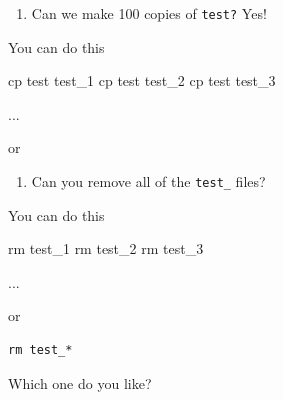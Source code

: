 \documentclass[
  letterpaper,
  DIV=11,
  numbers=noendperiod]{scrreprt}
\newenvironment{Shaded}{\begin{snugshade}}{\end{snugshade}}
\newcommand{\ControlFlowTok}[1]{\textcolor[rgb]{0.00,0.23,0.31}{#1}}
\newcommand{\DataTypeTok}[1]{\textcolor[rgb]{0.68,0.00,0.00}{#1}}
\newcommand{\DecValTok}[1]{\textcolor[rgb]{0.68,0.00,0.00}{#1}}
\newcommand{\ExtensionTok}[1]{\textcolor[rgb]{0.00,0.23,0.31}{#1}}
\newcommand{\FunctionTok}[1]{\textcolor[rgb]{0.28,0.35,0.67}{#1}}
\newcommand{\KeywordTok}[1]{\textcolor[rgb]{0.00,0.23,0.31}{#1}}
\newcommand{\NormalTok}[1]{\textcolor[rgb]{0.00,0.23,0.31}{#1}}
\newcommand{\StringTok}[1]{\textcolor[rgb]{0.13,0.47,0.30}{#1}}
\newcommand{\VariableTok}[1]{\textcolor[rgb]{0.07,0.07,0.07}{#1}}
\providecommand{\tightlist}{%
  \setlength{\itemsep}{0pt}\setlength{\parskip}{0pt}}\usepackage{longtable,booktabs,array}
\begin{document}
\begin{enumerate}
\def\labelenumi{\arabic{enumi}.}
\setcounter{enumi}{1}
\tightlist
\item
  Can we make 100 copies of \texttt{test?} Yes!
\end{enumerate}

You can do this

\begin{Shaded}
\begin{Highlighting}[]

\FunctionTok{cp}\NormalTok{ test test\_1 }
\FunctionTok{cp}\NormalTok{ test test\_2}
\FunctionTok{cp}\NormalTok{ test test\_3 }

\ExtensionTok{...} 
\end{Highlighting}
\end{Shaded}

or

\begin{Shaded}
\end{Shaded}

\begin{enumerate}
\def\labelenumi{\arabic{enumi}.}
\setcounter{enumi}{2}
\tightlist
\item
  Can you remove all of the \texttt{test\_} files?
\end{enumerate}

You can do this

\begin{Shaded}
\begin{Highlighting}[]
\FunctionTok{rm}\NormalTok{ test\_1}
\FunctionTok{rm}\NormalTok{ test\_2}
\FunctionTok{rm}\NormalTok{ test\_3 }

\ExtensionTok{...}
\end{Highlighting}
\end{Shaded}

or

\begin{verbatim}
rm test_*
\end{verbatim}

Which one do you like?
\end{document}
